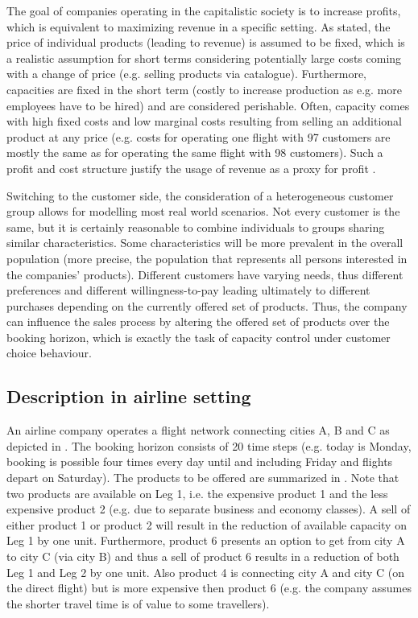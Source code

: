 The goal of companies operating in the capitalistic society is to increase profits, which is equivalent to maximizing revenue in a specific setting. As stated, the price of individual products (leading to revenue) is assumed to be fixed, which is a realistic assumption for short terms considering potentially large costs coming with a change of price (e.g. selling products via catalogue). Furthermore, capacities are fixed in the short term (costly to increase production as e.g. more employees have to be hired) and are considered perishable. Often, capacity comes with high fixed costs and low marginal costs resulting from selling an additional product at any price (e.g. costs for operating one flight with 97 customers are mostly the same as for operating the same flight with 98 customers). Such a profit and cost structure justify the usage of revenue as a proxy for profit \cite{Strauss.2018}.

Switching to the customer side, the consideration of a heterogeneous customer group allows for modelling most real world scenarios. Not every customer is the same, but it is certainly reasonable to combine individuals to groups sharing similar characteristics. Some characteristics will be more prevalent in the overall population (more precise, the population that represents all persons interested in the companies' products).  Different customers have varying needs, thus different preferences and different willingness-to-pay leading ultimately to different purchases depending on the currently offered set of products. Thus, the company can influence the sales process by altering the offered set of products over the booking horizon, which is exactly the task of capacity control under customer choice behaviour.

\subsection{Description in airline setting}\label{ss:Prob:AirDesc}

An airline company operates a flight network connecting cities A, B and C as depicted in . The booking horizon consists of 20 time steps (e.g. today is Monday, booking is possible four times every day until and including Friday and flights depart on Saturday). The products to be offered are summarized in . Note that two products are available on Leg 1, i.e. the expensive product 1 and the less expensive product 2 (e.g. due to separate business and economy classes). A sell of either product 1 or product 2 will result in the reduction of available capacity on Leg 1 by one unit. Furthermore, product 6 presents an option to get from city A to city C (via city B) and thus a sell of product 6 results in a reduction of both Leg 1 and Leg 2 by one unit. Also product 4 is connecting city A and city C (on the direct flight) but is more expensive then product 6 (e.g. the company assumes the shorter travel time is of value to some travellers). 

